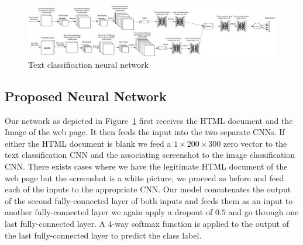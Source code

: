 \documentclass{article} %
\begin{document}
\begin{figure}
\centering
        \includegraphics[totalheight=3cm]{Combined}
    \caption{Text classification neural network}
    \label{fig:CNN}
\end{figure}

\subsection{Proposed Neural Network}
Our network as depicted in Figure~\ref{fig:CNN} first receives the HTML document and the Image of the web page. It then feeds the input into the two separate CNNs. If either the HTML document is blank we feed a $1\times200\times300$ zero vector to the text classification CNN and the associating screenshot to the image classification CNN. There exists cases where we have the legitimate HTML document of the web page but the screenshot is a white picture, we proceed as before and feed each of the inputs to the appropriate CNN. Our model concatenates the output of the second fully-connected layer of both inputs and feeds
them as an input to another fully-connected layer we again apply a dropout of $0.5$ and go through one last fully-connected layer. A 4-way softmax function is applied to the output of the last fully-connected layer to predict the class label.
\end{document}
